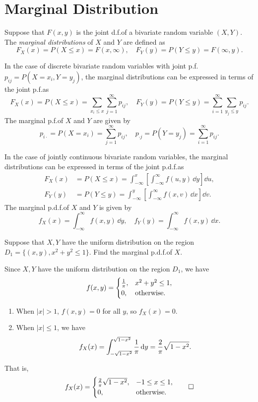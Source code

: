 \section{Marginal Distribution}

\begin{definition}
  Suppose that \(F(x, y)\) is the joint d.f.\@ of a bivariate random variable \((X, Y)\). The \emph{marginal distributions} of \(X\) and \(Y\) are defined as
  \[
    F_X(x) = P(X \leq x) = F(x, \infty), \quad F_Y(y) = P(Y \leq y) = F(\infty, y).
  \]
\end{definition}

In the case of discrete bivariate random variables with joint p.f.\@ \(p_{ij} = P(X = x_i, Y = y_j)\), the marginal distributions can be expressed in terms of the joint p.f.\@ as
\[
  F_X(x) = P(X \leq x) = \sum_{x_i \leq x} \sum_{j=1}^\infty p_{ij}, \quad F_Y(y) = P(Y \leq y) = \sum_{i=1}^\infty \sum_{y_j \leq y} p_{ij}.
\]
The marginal p.f.\@ of \(X\) and \(Y\) are given by
\[
  p_{i \cdot} = P(X = x_i) = \sum_{j=1}^\infty p_{ij}, \quad p_{\cdot j} = P(Y = y_j) = \sum_{i=1}^\infty p_{ij}.
\]

In the case of jointly continuous bivariate random variables, the marginal distributions can be expressed in terms of the joint p.d.f.\@ as
\begin{align*}
  F_X(x) &= P(X \leq x) = \int_{-\infty}^x \left[\int_{-\infty}^\infty f(u, y) \, \dd y \right] \dd u, \\
  F_Y(y) &= P(Y \leq y) = \int_{-\infty}^y \left[\int_{-\infty}^\infty f(x, v) \, \dd x \right] \dd v.
\end{align*}
The marginal p.d.f.\@ of \(X\) and \(Y\) is given by
\[
  f_X(x) = \int_{-\infty}^\infty f(x, y) \, \dd y, \quad f_Y(y) = \int_{-\infty}^\infty f(x, y) \, \dd x.
\]

\begin{example}
  Suppose that \(X, Y\) have the uniform distribution on the region \(D_1 = \{(x, y), x^2 + y^2 \leq 1\}\). Find the marginal p.d.f.\@ of \(X\).
\end{example}
\begin{solution}
  Since \(X, Y\) have the uniform distribution on the region \(D_1\), we have
  \[
    f(x, y) = \begin{cases}
      \frac{1}{\mathrm{\pi}}, & x^2 + y^2 \leq 1, \\
      0, & \text{otherwise}.
    \end{cases}
  \]
  \begin{enumerate}
    \item When \(|x| > 1\), \(f(x, y) = 0\) for all \(y\), so \(f_X(x) = 0\).
    \item When \(|x| \leq 1\), we have
    \[
      f_X(x) = \int_{-\sqrt{1 - x^2}}^{\sqrt{1 - x^2}} \frac{1}{\mathrm{\pi}} \, \mathrm{d} y = \frac{2}{\mathrm{\pi}}\sqrt{1 - x^2}.
    \]
  \end{enumerate}
  That is,
  \[
    f_X(x) = \begin{cases}
      \frac{2}{\mathrm{\pi}}\sqrt{1 - x^2}, & -1 \leq x \leq 1, \\
      0, & \text{otherwise}.
    \end{cases} \qedhere
  \]
\end{solution}

